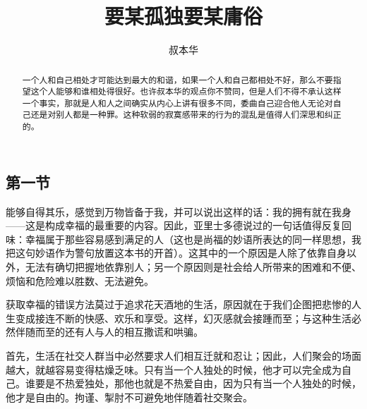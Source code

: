 \documentclass[11pt,oneside]{article}
\begin{document}
\title{要某孤独要某庸俗}
\author{叔本华}
\date{}
\maketitle

\begin{abstract}
一个人和自己相处才可能达到最大的和谐，如果一个人和自己都相处不好，那么不要指望这个人能够和谁相处得很好。也许叔本华的观点你不赞同，但是人们不得不承认这样一个事实，那就是人和人之间确实从内心上讲有很多不同，委曲自己迎合他人无论对自己还是对别人都是一种罪。这种软弱的寂寞感带来的行为的混乱是值得人们深思和纠正的。
\end{abstract}


\begin{common-format}

\section{第一节}
能够自得其乐，感觉到万物皆备于我，并可以说出这样的话：我的拥有就在我身——这是构成幸福的最重要的内容。因此，亚里士多德说过的一句话值得反复回味：幸福属于那些容易感到满足的人（这也是尚福的妙语所表达的同一样思想，我把这句妙语作为警句放置这本书的开首）。这其中的一个原因是人除了依靠自身以外，无法有确切把握地依靠别人；另一个原因则是社会给人所带来的困难和不便、烦恼和危险难以胜数、无法避免。 

获取幸福的错误方法莫过于追求花天酒地的生活，原因就在于我们企图把悲惨的人生变成接连不断的快感、欢乐和享受。这样，幻灭感就会接踵而至；与这种生活必然伴随而至的还有人与人的相互撒谎和哄骗。 

首先，生活在社交人群当中必然要求人们相互迁就和忍让；因此，人们聚会的场面越大，就越容易变得枯燥乏味。只有当一个人独处的时候，他才可以完全成为自己。谁要是不热爱独处，那他也就是不热爱自由，因为只有当一个人独处的时候，他才是自由的。拘谨、掣肘不可避免地伴随着社交聚会。 


\end{common-format}
\end{document}
